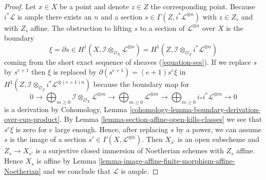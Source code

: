 \begin{proof}
\medskip\noindent
Let $x \in X$ be a point and denote $z \in Z$ the corresponding point.
Because $i^*\mathcal{L}$ is ample there exists an $n$ and a section
$s \in \Gamma(Z, i^*\mathcal{L}^{\otimes n})$ with $z \in Z_s$
and with $Z_s$ affine. The obstruction to lifting $s$ to a section
of $\mathcal{L}^{\otimes n}$ over $X$ is the boundary
$$
\xi = \partial s \in
H^1(X, \mathcal{I} \otimes_{\mathcal{O}_X} \mathcal{L}^{\otimes n}) =
H^1(Z, \mathcal{I} \otimes_{\mathcal{O}_Z} i^*\mathcal{L}^{\otimes n})
$$
coming from the short exact sequence of sheaves (\ref{equation-ses}).
If we replace $s$ by $s^{e + 1}$ then $\xi$ is replaced by
$\partial(s^{e + 1}) = (e + 1) s^e \xi$ in
$H^1(Z, \mathcal{I} \otimes_{\mathcal{O}_Z} i^*\mathcal{L}^{\otimes (e + 1)n})$
because the boundary map for
$$
0 \to
\bigoplus\nolimits_{m \geq 0}
\mathcal{I} \otimes_{\mathcal{O}_X} \mathcal{L}^{\otimes m} \to
\bigoplus\nolimits_{m \geq 0}
\mathcal{L}^{\otimes m} \to
\bigoplus\nolimits_{m \geq 0}
i_*i^*\mathcal{L}^{\otimes m} \to 0
$$
is a derivation by Cohomology, Lemma
\ref{cohomology-lemma-boundary-derivation-over-cup-product}. By
Lemma \ref{lemma-section-affine-open-kills-classes}
we see that $s^e \xi$ is zero for $e$ large enough.
Hence, after replacing $s$ by a power, we can assume $s$ is the image
of a section $s' \in \Gamma(X, \mathcal{L}^{\otimes n})$.
Then $X_{s'}$ is an open subscheme and $Z_s \to X_{s'}$ is a surjective
closed immersion of Noetherian schemes with $Z_s$ affine. Hence
$X_s$ is affine by
Lemma \ref{lemma-image-affine-finite-morphism-affine-Noetherian} and
we conclude that $\mathcal{L}$ is ample.
\end{proof}